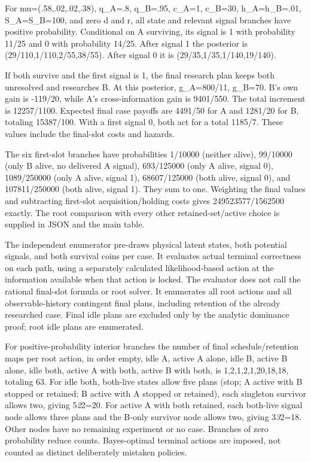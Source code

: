 \documentclass[
  11pt,
]{article}
\begin{document}
\begin{sloppypar}
For mu=(.58,.02,.02,.38), q\_A=.8, q\_B=.95, c\_A=1, c\_B=30,
h\_A=h\_B=.01, S\_A=S\_B=100, and zero d and r, all state and relevant
signal branches have positive probability. Conditional on A surviving,
its signal is 1 with probability 11/25 and 0 with probability 14/25.
After signal 1 the posterior is (29/110,1/110,2/55,38/55). After signal
0 it is (29/35,1/35,1/140,19/140).
\end{sloppypar}

If both survive and the first signal is 1, the final research plan keeps
both unresolved and researches B. At this posterior, g\_A=800/11,
g\_B=70. B's own gain is -119/20, while A's cross-information gain is
9401/550. The total increment is 12257/1100. Expected final case payoffs
are 4491/50 for A and 1281/20 for B, totaling 15387/100. With a first
signal 0, both act for a total 1185/7. These values include the
final-slot costs and hazards.

The six first-slot branches have probabilities 1/10000 (neither alive),
99/10000 (only B alive, no delivered A signal), 693/125000 (only A
alive, signal 0), 1089/250000 (only A alive, signal 1), 68607/125000
(both alive, signal 0), and 107811/250000 (both alive, signal 1). They
sum to one. Weighting the final values and subtracting first-slot
acquisition/holding costs gives 249523577/1562500 exactly. The root
comparison with every other retained-set/active choice is supplied in
JSON and the main table.

The independent enumerator pre-draws physical latent states, both
potential signals, and both survival coins per case. It evaluates actual
terminal correctness on each path, using a separately calculated
likelihood-based action at the information available when that action is
locked. The evaluator does not call the rational final-slot formula or
root solver. It enumerates all root actions and all observable-history
contingent final plans, including retention of the already researched
case. Final idle plans are excluded only by the analytic dominance
proof; root idle plans are enumerated.

For positive-probability interior branches the number of final
schedule/retention maps per root action, in order empty, idle A, active
A alone, idle B, active B alone, idle both, active A with both, active B
with both, is 1,2,1,2,1,20,18,18, totaling 63. For idle both, both-live
states allow five plans (stop; A active with B stopped or retained; B
active with A stopped or retained), each singleton survivor allows two,
giving 5\emph{2}2=20. For active A with both retained, each both-live
signal node allows three plans and the B-only survivor node allows two,
giving 3\emph{3}2=18. Other nodes have no remaining experiment or no
case. Branches of zero probability reduce counts. Bayes-optimal terminal
actions are imposed, not counted as distinct deliberately mistaken
policies.
\end{document}
